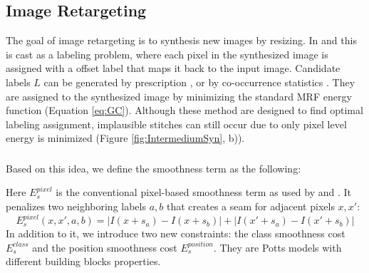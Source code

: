\documentclass{acmtog}
\begin{document}
\subsection{Image Retargeting}

The goal of image retargeting is to synthesis new images by resizing. In \cite{Pritch09ICCV} and \cite{He2012PO} this is cast as a labeling problem, where each pixel in the synthesized image is assigned with a offset label that maps it back to the input image. Candidate labels $L$ can be generated by prescription \cite{Pritch09ICCV},  or by co-occurrence statistics \cite{He2012PO}. They are assigned to the synthesized image by minimizing the standard MRF energy function (Equation \ref{eq:GC}). Although these method are designed to find optimal labeling assignment, implausible stitches can still occur due to only pixel level energy is minimized (Figure \ref{fig:IntermediumSyn}, b)). 


\subsubsection{}

 Based on this idea, we define the smoothness term as the following:


Here $E_{s}^{pixel}$ is the conventional pixel-based smoothness term as used by \cite{Pritch09ICCV} and \cite{He2012PO}. It penalizes two neighboring labels $a, b$ that creates a seam for adjacent pixels $x, x'$:
%
\begin{equation}
E_{s}^{pixel}(x, x', a, b) = |I(x + s_{a}) - I(x + s_{b})| + |I(x' + s_{a}) - I(x' + s_{b})|
\label{eq:EPixelSmooth}
\end{equation}
%
In addition to it, we introduce two new constraints: the class smoothness cost $E_{s}^{class}$ and the position smoothness cost $E_{s}^{position}$. They are Potts models  with different building blocks properties. 
\end{document}
